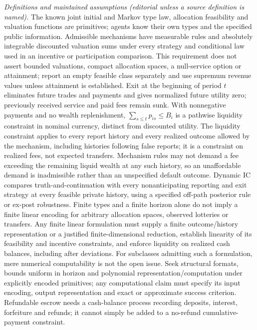 \documentclass[11pt,a4paper]{article}
\begin{document}
\emph{Definitions and maintained assumptions (editorial unless a source definition is named).} The known joint initial and Markov type law, allocation feasibility and valuation functions are primitives; agents know their own types and the specified public information. Admissible mechanisms have measurable rules and absolutely integrable discounted valuation sums under every strategy and conditional law used in an incentive or participation comparison. This requirement does not assert bounded valuations, compact allocation spaces, a null-service option or attainment; report an empty feasible class separately and use supremum revenue values unless attainment is established. Exit at the beginning of period \(t\) eliminates future trades and payments and gives normalized future utility zero; previously received service and paid fees remain sunk. With nonnegative payments and no wealth replenishment, \(\sum_{s\le t}p_{is}\le B_i\) is a pathwise liquidity constraint in nominal currency, distinct from discounted utility. The liquidity constraint applies to every report history and every realized outcome allowed by the mechanism, including histories following false reports; it is a constraint on realized fees, not expected transfers. Mechanism rules may not demand a fee exceeding the remaining liquid wealth at any such history, so an unaffordable demand is inadmissible rather than an unspecified default outcome. Dynamic IC compares truth-and-continuation with every nonanticipating reporting and exit strategy at every feasible private history, using a specified off-path posterior rule or ex-post robustness. Finite types and a finite horizon alone do not imply a finite linear encoding for arbitrary allocation spaces, observed lotteries or transfers. Any finite linear formulation must supply a finite outcome/history representation or a justified finite-dimensional reduction, establish linearity of its feasibility and incentive constraints, and enforce liquidity on realized cash balances, including after deviations. For subclasses admitting such a formulation, mere numerical computability is not the open issue. Seek structural formats, bounds uniform in horizon and polynomial representation/computation under explicitly encoded primitives; any computational claim must specify its input encoding, output representation and exact or approximate success criterion. Refundable escrow needs a cash-balance process recording deposits, interest, forfeiture and refunds; it cannot simply be added to a no-refund cumulative-payment constraint.
\end{document}
